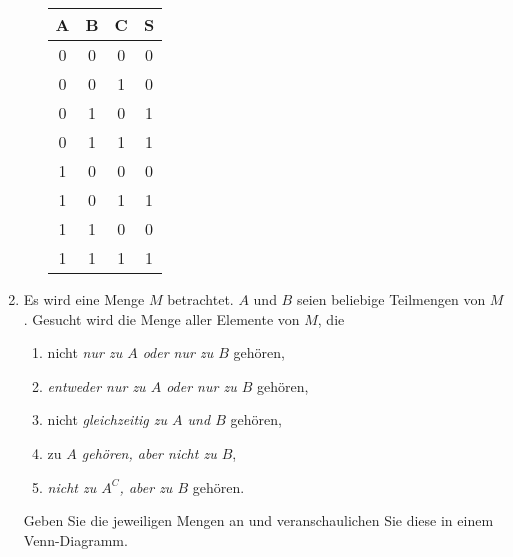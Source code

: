 \documentclass[12pt,a4paper]{scrreprt}
\begin{document}
\begin{enumerate}
\begin{center}
\begin{enumerate}
			\begin{tabular}{c c c| c}
					A & B & C &S \\
					\hline
					0	&0	&0	&0 \\
					0	&0	&1	&0 \\
					0	&1	&0	&1 \\
					0	&1	&1	&1 \\
					1	&0	&0	&0 \\
					1	& 0	&1	&1 \\
					1	&1	& 0	&0 \\
					1	&1	&1	&1 
			\end{tabular}
	
\end{enumerate}
\end{center}
     



    \item Es wird eine Menge $M$ betrachtet. $A$ und $B$ seien beliebige Teilmengen von $M$.  Gesucht wird die Menge aller Elemente von $M$, die
		\begin{enumerate}
						\item  nicht \textit{nur zu $A$ oder nur zu $B$} gehören,
						\item  \textit{entweder nur zu $A$ oder nur zu $B$} gehören,
						\item nicht \textit{gleichzeitig zu $A$ und $B$} gehören,
						\item zu \textit{$A$ gehören, aber nicht zu $B$},
						\item \textit{nicht zu $A^C$, aber zu $B$} gehören.
		 \end{enumerate}
	 Geben Sie die jeweiligen Mengen an und veranschaulichen Sie diese in einem Venn-Diagramm.
	 

\end{enumerate}
\end{document}
